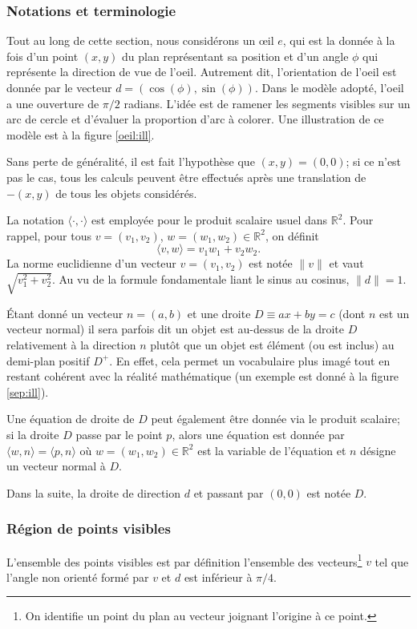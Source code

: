 \subsubsection{Notations et terminologie}\label{not:oeil}
Tout au long de cette section, nous considérons un \oe{}il $e$, qui est la donnée à
la fois d'un point $(x, y)$ du plan représentant sa position et d'un angle $\phi$
qui représente la direction de vue de l'oeil. Autrement dit, l'orientation de
l'oeil est donnée par le vecteur $d=(\cos(\phi), \sin(\phi))$. Dans le modèle
adopté, l'oeil a une ouverture de $\pi/2$ radians. L'idée est de ramener
les segments visibles sur un arc de cercle et d'évaluer la proportion d'arc
à colorer. Une illustration de ce modèle est à la figure \ref{oeil:ill}.



Sans perte de généralité, il est fait l'hypothèse que $(x, y) = (0, 0)$;
si ce n'est pas le cas, tous les
calculs peuvent être effectués après une translation de $-(x, y)$ de tous
les objets considérés.

La notation $\langle \cdot,\cdot\rangle$ est employée pour le produit
scalaire usuel dans $\mathbb R^2$. Pour rappel,
pour tous $v=(v_1, v_2)$, $w=(w_1, w_2)\in\mathbb R^2$, on définit
$$\langle v, w\rangle = v_1 w_1 + v_2 w_2.$$
La norme euclidienne d'un vecteur $v = (v_1, v_2)$ est notée
$\|v\|$ et vaut $\sqrt{v_1^2 + v_2^2}$. Au vu de la formule fondamentale liant le
sinus au cosinus, $\|d\| = 1$.

\'Etant  donné un vecteur $n = (a, b)$ et une droite $D\equiv ax+by=c$
(dont $n$ est un vecteur normal) il sera parfois dit
\og un objet est au-dessus de la droite $D$ relativement à la direction $n$\fg{}
plutôt que \og{}un objet est élément (ou est inclus) au demi-plan positif $D^+$\fg{}.
En effet, cela permet un vocabulaire plus imagé tout en restant cohérent
avec la réalité mathématique (un exemple est donné à la figure \ref{sep:ill}).

Une équation de droite de $D$ peut également être donnée via le produit scalaire;
si la droite $D$ passe par le point $p$, alors une équation est donnée par
$\langle w, n\rangle = \langle p, n\rangle$ où $w=(w_1, w_2)\in\mathbb R^2$ est
la variable de l'équation et $n$ désigne un vecteur normal à $D$.

Dans la suite, la droite de direction $d$ et passant par $(0, 0)$ est notée $D$.
\subsubsection{Région de points visibles}
L'ensemble des points visibles est par définition l'ensemble
des vecteurs\footnote{On identifie un point du plan au vecteur
  joignant l'origine à ce point.} $v$ tel que l'angle non orienté formé
par $v$ et $d$ est inférieur à $\pi/4$.

